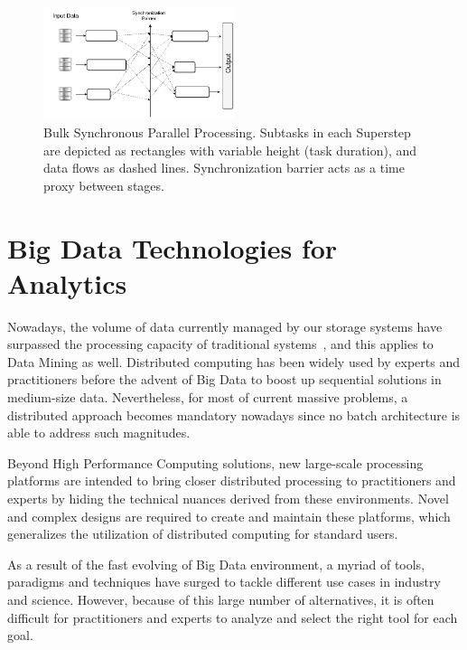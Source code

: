 \documentclass[3p,review]{elsarticle}
\begin{document}
	\begin{figure}[htp]
		\centering
		\includegraphics[width=0.5\textwidth]{bsp}
		\caption{Bulk Synchronous Parallel Processing. Subtasks in each Superstep are depicted as rectangles with variable height (task duration), and data flows as dashed lines. Synchronization barrier acts as a time proxy between stages.}
		\label{fig:bsp}
	\end{figure}
	
	\section{Big Data Technologies for Analytics}\label{sec:techno}
	
	Nowadays, the volume of data currently managed by our storage systems have surpassed the processing capacity of traditional systems~\cite{wu14}, and this applies to Data Mining as well. Distributed computing has been widely used by experts and practitioners before the advent of Big Data to boost up sequential solutions in medium-size data. Nevertheless, for most of current massive problems, a distributed approach becomes mandatory nowadays since no batch architecture is able to address such magnitudes. %
	
	Beyond High Performance Computing solutions, new large-scale processing platforms are intended to bring closer distributed processing to practitioners and experts by hiding the technical nuances derived from these environments. Novel and complex designs are required to create and maintain these platforms, which generalizes the utilization of distributed computing for standard users. 
	
	As a result of the fast evolving of Big Data environment, a myriad of tools, paradigms and techniques have surged to tackle different use cases in industry and science. However, because of this large number of alternatives, it is often difficult for practitioners and experts to analyze and select the right tool for each goal. 
	
\end{document}
